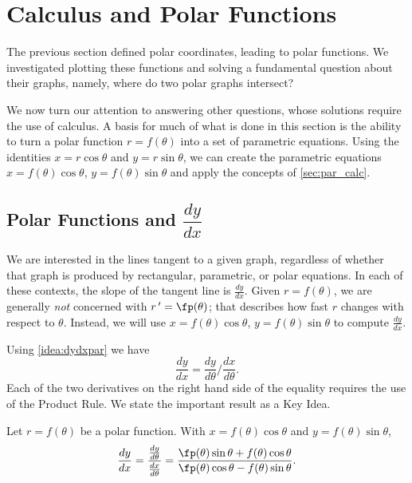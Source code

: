 \section{Calculus and Polar Functions} \label{sec:polarcalc}

The previous section defined polar coordinates, leading to polar functions. We investigated plotting these functions and solving a fundamental question about their graphs, namely, where do two polar graphs intersect?

We now turn our attention to answering other questions, whose solutions require the use of calculus. A basis for much of what is done in this section is the ability to turn a polar function $r=f(\theta)$ into a set of parametric equations. Using the identities $x=r\cos \theta$ and $y=r\sin \theta$, we can create the parametric equations $x=f(\theta)\cos\theta$, $y=f(\theta)\sin\theta$ and apply the concepts of \autoref{sec:par_calc}.

\subsection*{Polar Functions and $\dfrac{dy}{dx}$}

We are interested in the lines tangent to a given graph, regardless of whether that graph is produced by rectangular, parametric, or polar equations. In each of these contexts, the slope of the tangent line is $\frac{dy}{dx}$. Given $r=f(\theta)$, we are generally \textit{not} concerned with $r\,'=\fp(\theta)$; that describes how fast $r$ changes with respect to $\theta$. Instead, we will use $x=f(\theta)\cos\theta$, $y=f(\theta)\sin\theta$ to compute $\frac{dy}{dx}$. 

Using \autoref{idea:dydxpar} we have $$\frac{dy}{dx} = \frac{dy}{d\theta}\Big/\frac{dx}{d\theta}.$$ Each of the two derivatives on the right hand side of the equality requires the use of the Product Rule. We state the important result as a Key Idea.

{Let $r=f(\theta)$ be a polar function. With $x=f(\theta)\cos\theta$ and $y=f(\theta)\sin\theta$,
\[
 \frac{dy}{dx}
 =\frac{\frac{dy}{d\theta}}{\frac{dx}{d\theta}}
 =\frac{\fp(\theta)\sin\theta+f(\theta)\cos\theta}{\fp(\theta)\cos\theta-f(\theta)\sin\theta}.
\]
}



